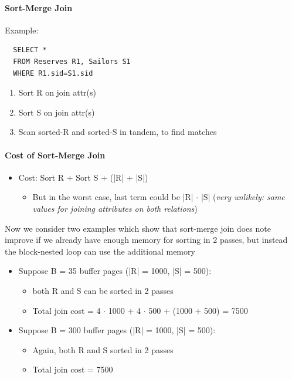 \paragraph{Sort-Merge Join}
Example:
\begin{lstlisting}
  SELECT *
  FROM Reserves R1, Sailors S1
  WHERE R1.sid=S1.sid
\end{lstlisting}

\begin{enumerate}
\item Sort R on join attr(s)
\item Sort S on join attr(s)
\item Scan sorted-R and sorted-S in tandem, to find matches
\end{enumerate}

\paragraph{Cost of Sort-Merge Join}

\begin{itemize}
\item Cost: Sort R + Sort S + (|R| + |S|)
  \begin{itemize}
  \item But in the worst case, last term could be |R| $\cdot$ |S|
    (\textit{very unlikely: same values for joining
    attributes on both relations})
  \end{itemize}
\end{itemize}


Now we consider two examples which show that sort-merge join
does note improve if we already have enough memory for sorting
in 2 passes, but instead the block-nested loop can use
the additional memory

\begin{itemize}
\item Suppose B = 35 buffer pages (|R| = 1000, |S| = 500):
  \begin{itemize}
  \item both R and S can be sorted in 2 passes
  \item Total join cost = 4 $\cdot$ 1000 + 4 $\cdot$ 500
    + (1000 + 500) = 7500
  \end{itemize}
\end{itemize}

\begin{itemize}
\item Suppose B = 300 buffer pages (|R| = 1000, |S| = 500):
  \begin{itemize}
  \item Again, both R and S sorted in 2 passes
  \item Total join cost = 7500
  \end{itemize}
\end{itemize}

